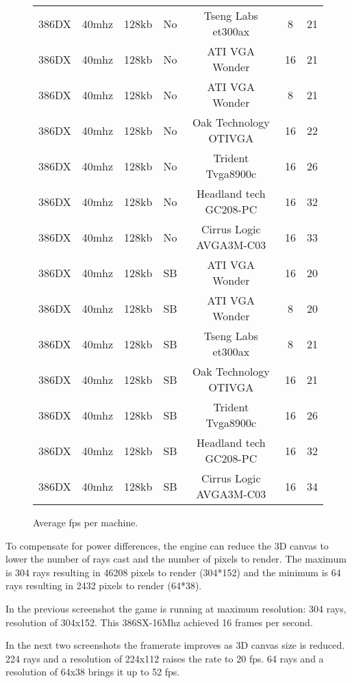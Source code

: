 \begin{figure}[H]
\begin{tabularx}{\textwidth}{ c  c c  c  c c c }
386DX &	40mhz	&128kb		& No & Tseng Labs et300ax	& 8	& 21 \\
386DX &	40mhz	&128kb		& No & ATI VGA Wonder	& 16	& 21 \\
386DX &	40mhz	&128kb		& No & ATI VGA Wonder	& 8	& 21 \\
386DX &	40mhz	&128kb		& No & Oak Technology OTIVGA  & 	16	&	22 \\
386DX &	40mhz	&128kb		& No &  Trident Tvga8900c	& 16	&	26 \\
386DX &	40mhz	&128kb		& No & Headland tech GC208-PC	& 16	&	32 \\
386DX &	40mhz	&128kb		& No & Cirrus Logic AVGA3M-C03	& 16	&	33 \\ \bottomrule

386DX &	40mhz	&128kb		& SB	& ATI VGA Wonder	& 16	& 20 \\
386DX &	40mhz	&128kb		& SB	& ATI VGA Wonder	& 8	& 20 \\
386DX &	40mhz	&128kb		& SB	& Tseng Labs et300ax	& 8	& 21 \\
386DX &	40mhz	&128kb		& SB	& Oak Technology OTIVGA  & 	16	&	21 \\
386DX &	40mhz	&128kb		& SB	&  Trident Tvga8900c	& 16	&	26 \\
386DX &	40mhz	&128kb		& SB	& Headland tech GC208-PC	& 16	&	32 \\
386DX &	40mhz	&128kb		& SB &	Cirrus Logic AVGA3M-C03	& 16	&	34 \\ \bottomrule
\end{tabularx}
\caption{Average fps per machine.}
\label{perf_summary}
\end{figure}



To compensate for power differences, the engine can reduce the 3D canvas to lower the number of rays cast and the number of pixels to render. The maximum is 304 rays resulting in 46208 pixels to render (304*152) and the minimum is 64 rays resulting in 2432 pixels to render (64*38).\\
  \begin{figure}[H]
\centering
 \end{figure}
 \par
 In the previous screenshot the game is running at maximum resolution: 304 rays, resolution of 304x152. This 386SX-16Mhz achieved 16 frames per second.\\
 \par
 In the next two screenshots the framerate improves as 3D canvas size is reduced. 224 rays and a resolution of 224x112 raises the rate to 20 fps. 64 rays and a resolution of 64x38 brings it up to 52 fps.\\
 

